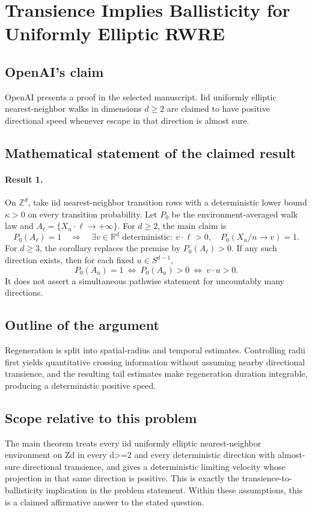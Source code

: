 \documentclass[11pt]{article}
\begin{document}
\section*{Transience Implies Ballisticity for Uniformly Elliptic RWRE}

\subsection{OpenAI's claim}
OpenAI presents a proof in the selected manuscript. Iid uniformly elliptic nearest-neighbor walks in dimensions $d\geq2$ are claimed to have positive directional speed whenever escape in that direction is almost sure.

\subsection{Mathematical statement of the claimed result}
\paragraph{Result 1.} On \(\mathbb Z^d\), take iid nearest-neighbor transition rows with a deterministic lower bound \(\kappa>0\) on every transition probability. Let \(P_0\) be the environment-averaged walk law and \(A_\ell=\{X_n\cdot\ell\to+\infty\}\). For \(d\ge2\), the main claim is
\[
 P_0(A_\ell)=1\quad\Longrightarrow\quad
 \exists v\in\mathbb R^d\text{ deterministic}:\
 v\cdot\ell>0,\quad P_0(X_n/n\to v)=1.
\]
For \(d\ge3\), the corollary replaces the premise by \(P_0(A_\ell)>0\). If any such direction exists, then for each fixed \(u\in S^{d-1}\),
\[
 P_0(A_u)=1\ \Longleftrightarrow\ P_0(A_u)>0\ \Longleftrightarrow\ v\cdot u>0.
\]
It does not assert a simultaneous pathwise statement for uncountably many directions.

\subsection{Outline of the argument}
Regeneration is split into spatial-radius and temporal estimates. Controlling radii first yields quantitative crossing information without assuming nearby directional transience, and the resulting tail estimates make regeneration duration integrable, producing a deterministic positive speed.

\subsection{Scope relative to this problem}
The main theorem treats every iid uniformly elliptic nearest-neighbor environment on Zd in every d>=2 and every deterministic direction with almost-sure directional transience, and gives a deterministic limiting velocity whose projection in that same direction is positive. This is exactly the transience-to-ballisticity implication in the problem statement. Within these assumptions, this is a claimed affirmative answer to the stated question.
\end{document}
